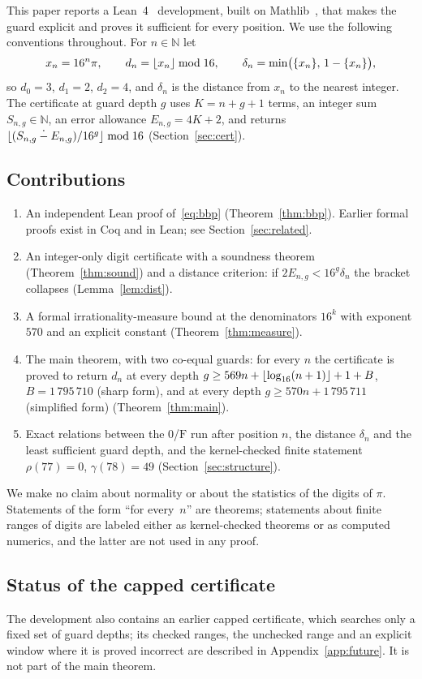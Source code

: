 \documentclass[11pt]{amsart}
\theoremstyle{definition}
\theoremstyle{remark}
\newcommand{\N}{\mathbb{N}}
\newcommand{\Sng}{S_{n,g}}
\newcommand{\Eng}{E_{n,g}}
\newcommand{\monus}{\mathbin{\dot{-}}}
\newcommand{\dist}{\delta}
\newcommand{\run}{\rho}
\newcommand{\gap}{\gamma}
\DeclarePairedDelimiter{\floor}{\lfloor}{\rfloor}
\newcommand{\Bconst}{1\,795\,710}
\newcommand{\Bsimple}{1\,795\,711}
\begin{document}
This paper reports a Lean~4~\cite{Lean4} development, built on
Mathlib~\cite{Mathlib2020}, that makes the
guard explicit and proves it sufficient for every position. We use the
following conventions throughout. For $n\in\N$ let
\[
  x_n=16^n\pi,\qquad d_n=\floor{x_n}\bmod 16,\qquad
  \dist_n=\min\bigl(\{x_n\},\,1-\{x_n\}\bigr),
\]
so $d_0=3$, $d_1=2$, $d_2=4$, and $\dist_n$ is the distance from $x_n$ to the
nearest integer. The certificate at guard depth $g$ uses
$K=n+g+1$ terms, an integer sum $\Sng\in\N$, an error allowance
$\Eng=4K+2$, and returns $\floor{(\Sng\monus\Eng)/16^g}\bmod16$
(Section~\ref{sec:cert}).

\subsection*{Contributions}
\begin{enumerate}
\item An independent Lean proof of~\eqref{eq:bbp}
  (Theorem~\ref{thm:bbp}). Earlier formal proofs exist in Coq and in
  Lean; see Section~\ref{sec:related}.
\item An integer-only digit certificate with a soundness theorem
  (Theorem~\ref{thm:sound}) and a distance criterion: if
  $2\Eng<16^g\dist_n$ the bracket collapses (Lemma~\ref{lem:dist}).
\item A formal irrationality-measure bound at the denominators $16^k$ with
  exponent $570$ and an explicit constant (Theorem~\ref{thm:measure}).
\item The main theorem, with two co-equal guards: for every $n$ the
  certificate is proved to return $d_n$ at every depth
  $g\ge569n+\floor{\log_{16}(n+1)}+1+B$, $B=\Bconst$ (sharp form), and at
  every depth $g\ge570n+\Bsimple$ (simplified form)
  (Theorem~\ref{thm:main}).
\item Exact relations between the $0$/$\mathrm{F}$ run after position $n$,
  the distance $\dist_n$ and the least sufficient guard depth, and the
  kernel-checked finite statement $\run(77)=0$, $\gap(78)=49$
  (Section~\ref{sec:structure}).
\end{enumerate}

We make no claim about normality or about the statistics of the digits of
$\pi$. Statements of the form ``for every~$n$'' are theorems; statements about
finite ranges of digits are labeled either as kernel-checked theorems or as
computed numerics, and the latter are not used in any proof.

\subsection*{Status of the capped certificate}
The development also contains an earlier capped certificate, which searches
only a fixed set of guard depths; its checked ranges, the unchecked range and
an explicit window where it is proved incorrect are described in
Appendix~\ref{app:future}. It is not part of the main theorem.
\end{document}
